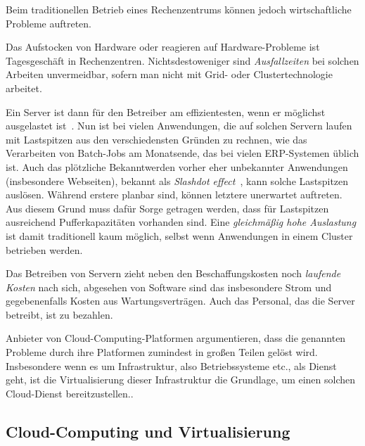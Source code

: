 
Beim traditionellen Betrieb eines Rechenzentrums können jedoch
wirtschaftliche Probleme auftreten. 

Das Aufstocken von Hardware oder reagieren auf Hardware-Probleme ist
Tagesgeschäft in Rechenzentren. Nichtsdestoweniger sind
\emph{Ausfallzeiten} bei solchen Arbeiten unvermeidbar, sofern man
nicht mit Grid- oder Clustertechnologie arbeitet. 

Ein Server ist dann für den Betreiber am effizientesten, wenn er
möglichst ausgelastet ist~\cite{Schwarzer2010:Cloud-Hype-Tren}. Nun
ist bei vielen Anwendungen, die auf solchen Servern laufen mit
Lastspitzen aus den verschiedensten Gründen zu rechnen, wie das
Verarbeiten von Batch-Jobs am Monatsende, das bei vielen
\ac{ERP}-Systemen üblich ist. Auch das plötzliche Bekanntwerden vorher
eher unbekannter Anwendungen (insbesondere Webseiten), bekannt als
\emph{Slashdot effect}~\cite{halavais2001slashdot}, kann solche
Lastspitzen auslösen. Während erstere planbar sind, können letztere
unerwartet auftreten. Aus diesem Grund muss dafür Sorge getragen
werden, dass für Lastspitzen ausreichend Pufferkapazitäten vorhanden
sind. Eine \emph{gleichmäßig hohe Auslastung} ist damit traditionell
kaum möglich, selbst wenn Anwendungen in einem Cluster betrieben
werden.

Das Betreiben von Servern zieht neben den Beschaffungskosten noch
\emph{laufende Kosten} nach sich, abgesehen von Software sind das
insbesondere Strom und gegebenenfalls Kosten aus Wartungsverträgen.
Auch das Personal, das die Server betreibt, ist zu bezahlen.
\medskip

Anbieter von Cloud-Computing-Platformen argumentieren, dass die
genannten Probleme durch ihre Platformen zumindest in großen Teilen
gelöst wird\cite{heroku,engineyard,openstack}. Insbesondere wenn es um
Infrastruktur, also Betriebssysteme etc., als Dienst geht, ist die
Virtualisierung dieser Infrastruktur die Grundlage, um einen solchen
Cloud-Dienst bereitzustellen.\cite{nomadbioslivemigration-cloudseminar}.







\subsection{Cloud-Computing und Virtualisierung}
\label{sec:ziel}

